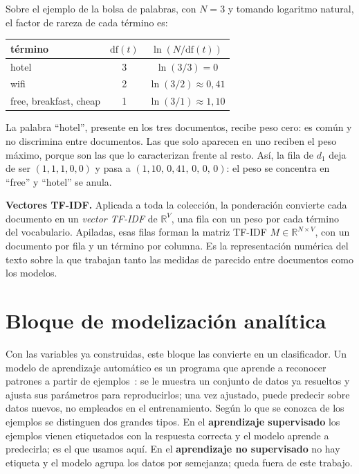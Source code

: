 \documentclass[12pt,a4paper]{report}
\theoremstyle{definition}
\begin{document}
Sobre el ejemplo de la bolsa de palabras, con $N=3$ y tomando logaritmo natural, el factor de rareza
de cada término es:
\begin{center}
\begin{tabular}{lcc}
\toprule
término & $\mathrm{df}(t)$ & $\ln(N/\mathrm{df}(t))$ \\
\midrule
hotel                  & 3 & $\ln(3/3)=0$ \\
wifi                   & 2 & $\ln(3/2)\approx 0{,}41$ \\
free, breakfast, cheap & 1 & $\ln(3/1)\approx 1{,}10$ \\
\bottomrule
\end{tabular}
\end{center}
La palabra ``hotel'', presente en los tres documentos, recibe peso cero: es común y no discrimina entre
documentos. Las que solo aparecen en uno reciben el peso máximo, porque son las que lo caracterizan
frente al resto. Así, la fila de $d_1$ deja de ser $(1,1,1,0,0)$ y pasa a
$(1{,}10,\,0{,}41,\,0,\,0,\,0)$: el peso se concentra en ``free'' y ``hotel'' se anula.

\medskip
\noindent\textbf{Vectores TF-IDF.} Aplicada a toda la colección, la ponderación convierte cada
documento en un \emph{vector TF-IDF} de $\mathbb{R}^V$, una fila con un peso por cada término del
vocabulario. Apiladas, esas filas forman la matriz TF-IDF $M\in\mathbb{R}^{N\times V}$, con un
documento por fila y un término por columna. Es la representación numérica del texto sobre la que
trabajan tanto las medidas de parecido entre documentos como los modelos.

\section{Bloque de modelización analítica}
\label{sec:modelizacion}

Con las variables ya construidas, este bloque las convierte en un clasificador. Un modelo de
aprendizaje automático es un programa que aprende a reconocer patrones a partir de
ejemplos~\cite{mitchell1997ml}: se le muestra un conjunto de datos ya resueltos y ajusta sus parámetros
para reproducirlos; una vez ajustado, puede predecir sobre datos nuevos, no empleados en el entrenamiento. Según lo que se
conozca de los ejemplos se distinguen dos grandes tipos. En el \textbf{aprendizaje supervisado} los
ejemplos vienen etiquetados con la respuesta correcta y el modelo aprende a predecirla; es el que
usamos aquí. En el \textbf{aprendizaje no supervisado} no hay etiqueta y el modelo agrupa los datos por
semejanza; queda fuera de este trabajo.
\end{document}
